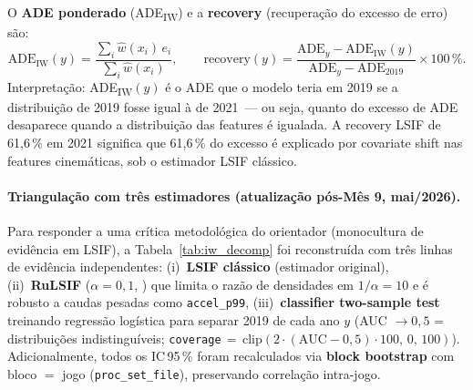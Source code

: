 \documentclass[11pt,a4paper]{article}
\begin{document}
O \textbf{ADE ponderado} (ADE\textsubscript{IW}) e a \textbf{recovery} (recupera\c{c}\~ao do excesso de erro) s\~ao:
\begin{equation}
\mathrm{ADE}_{\mathrm{IW}}(y) =
    \frac{\displaystyle\sum_{i} \hat{w}(x_i)\,e_i}
         {\displaystyle\sum_{i} \hat{w}(x_i)}, \qquad
\mathrm{recovery}(y) =
    \frac{\mathrm{ADE}_y - \mathrm{ADE}_{\mathrm{IW}}(y)}
         {\mathrm{ADE}_y - \mathrm{ADE}_{2019}} \times 100\,\%.
\label{eq:iw}
\end{equation}
Interpreta\c{c}\~ao: ADE\textsubscript{IW}$(y)$ \'e o ADE que o modelo teria em 2019 se a distribui\c{c}\~ao de 2019 fosse igual \`a de 2021~--- ou seja, quanto do excesso de ADE desaparece quando a distribui\c{c}\~ao das features \'e igualada. A recovery LSIF de 61{,}6\,\% em 2021 significa que 61{,}6\,\% do excesso \'e explicado por covariate shift nas features cinem\'aticas, sob o estimador LSIF cl\'assico.

\paragraph{Triangula\c{c}\~ao com tr\^es estimadores (atualiza\c{c}\~ao p\'os-M\^es 9, mai/2026).}
Para responder a uma cr\'itica metodol\'ogica do orientador (monocultura de evid\^encia em LSIF), a Tabela~\ref{tab:iw_decomp} foi reconstru\'ida com tr\^es linhas de evid\^encia independentes:
(i)~\textbf{LSIF cl\'assico} (estimador original),
(ii)~\textbf{RuLSIF} ($\alpha\!=\!0{,}1$, \cite{yamada2013}) que limita o raz\~ao de densidades em $1/\alpha\!=\!10$ e \'e robusto a caudas pesadas como \texttt{accel\_p99},
(iii)~\textbf{classifier two-sample test} \cite{lopezpaz2017} treinando regress\~ao log\'istica para separar 2019 de cada ano $y$ (AUC $\to 0{,}5$ = distribui\c{c}\~oes indistingu\'iveis; \texttt{coverage}\,$=\,\mathrm{clip}(2{\cdot}(\mathrm{AUC}{-}0{,}5){\cdot}100,\,0,\,100)$).
Adicionalmente, todos os IC\,95\,\% foram recalculados via \textbf{block bootstrap} com bloco $=$ jogo (\texttt{proc\_set\_file}), preservando correla\c{c}\~ao intra-jogo.
\end{document}
